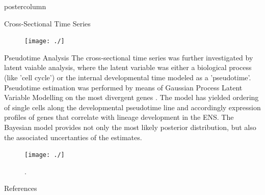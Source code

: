 \documentclass{beamer}
\begin{document}
\begin{frame}
\begin{columns}
\begin{column}{.45\textwidth}
\begin{beamercolorbox}[center]{postercolumn}
\begin{minipage}{.98\textwidth}
{\begin{myblock}{Cross-Sectional Time Series}
\begin{figure}
\begin{minipage}{1.0\textwidth}
	\centering\texttt{[image: ./]}
	\caption{
			}
	\label{fig:timeseries}
\end{minipage}
\end{figure}
\end{myblock}\vfill
\begin{myblock}{Pseudotime Analysis}
The cross-sectional time series was further investigated by latent vaiable analysis,
where the latent variable was either a biological process (like 'cell cycle')
or the internal developmental time modeled as a 'pseudotime'.
Pseudotime estimation was performed by means of Gaussian Process Latent
Variable Modelling on the most divergent genes \cite{Reid_2016}.
The model has yielded ordering of single cells along the developmental
pseudotime line and accordingly expression profiles of genes that correlate with
lineage development in the ENS. The Bayesian model provides not only the most likely
posterior distribution, but also the associated uncertanties of the estimates.

\begin{figure}
\begin{minipage}{0.45\textwidth}
	\centering\texttt{[image: ./]}
	\caption{.}
	\label{fig:pseudotime}
\end{minipage}
\end{figure}
\end{myblock}\vfill

\begin{myblock}{References}
\footnotesize


\end{myblock}\vfill
}\end{minipage}
\end{beamercolorbox}
\end{column}
\end{columns}
\end{frame}
\end{document}
